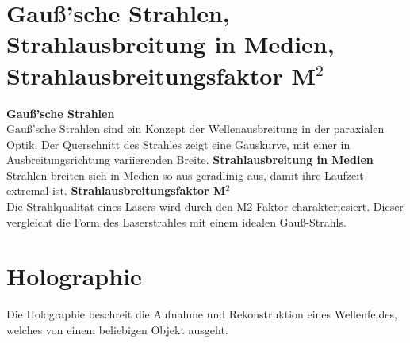 \section{Gauß'sche Strahlen, Strahlausbreitung in Medien, Strahlausbreitungsfaktor M$^2$}
\textbf{Gauß'sche Strahlen}\\
Gauß'sche Strahlen sind ein Konzept der Wellenausbreitung in der paraxialen Optik.
Der Querschnitt des Strahles zeigt eine Gauskurve, mit einer in Ausbreitungsrichtung variierenden Breite.
\textbf{Strahlausbreitung in Medien}\\
Strahlen breiten sich in Medien so aus geradlinig aus, damit ihre Laufzeit extremal ist.
\textbf{Strahlausbreitungsfaktor M$^2$}\\
Die Strahlqualität eines Lasers wird durch den M2 Faktor charakteriesiert.
Dieser vergleicht die Form des Laserstrahles mit einem idealen Gauß-Strahls.
\section{Holographie}
Die Holographie beschreit die Aufnahme und Rekonstruktion eines Wellenfeldes, welches von einem beliebigen Objekt ausgeht.

